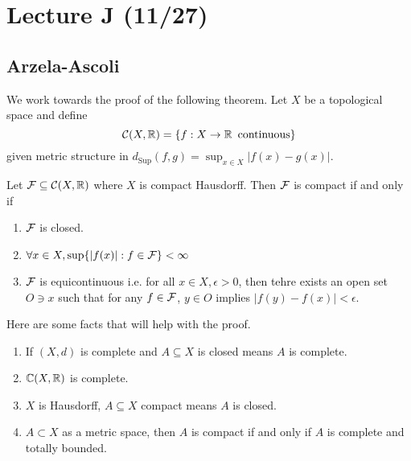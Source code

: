 

\section{Lecture J (11/27)}
\subsection{Arzela-Ascoli}

We work towards the proof of the following theorem.
Let $X$ be a topological space and define
\[ \mathcal{C}(X, \operatorname{\mathbb{R}}) = \{f: X \to \operatorname{\mathbb{R}} \text{ continuous}\} \]
given metric structure in $d_{\text{Sup}}(f, g) = \sup_{x \in X} |f(x) - g(x)|$.
\begin{theorem}
    Let $\mathcal{F} \subseteq \mathcal{C}(X, \operatorname{\mathbb{R}})$ where $X$ is compact Hausdorff.
    Then $\mathcal{F}$ is compact if and only if
    \begin{enumerate}
        \item $\mathcal{F}$ is closed.
        \item $\forall x \in X, \sup\{|f(x)| : f \in \mathcal{F}\} < \infty$
        \item $\mathcal{F}$ is equicontinuous i.e. for all $x \in X, \epsilon > 0$,
        then tehre exists an open set $O \ni x$ such that for any $f \in \mathcal{F}$,
        $y \in O$ implies $|f(y) - f(x)| < \epsilon$.
    \end{enumerate}
\end{theorem}

Here are some facts that will help with the proof.
\begin{enumerate}
    \item If $(X, d)$ is complete and $A \subseteq X$ is closed means $A$ is complete.
    \item $\operatorname{\mathbb{C}}(X, \operatorname{\mathbb{R}})$ is complete.
    \item $X$ is Hausdorff, $A \subseteq X$ compact means $A$ is closed.
    \item $A \subset X$ as a metric space, then $A$ is compact if and only if $A$ is complete and totally bounded.
\end{enumerate}

